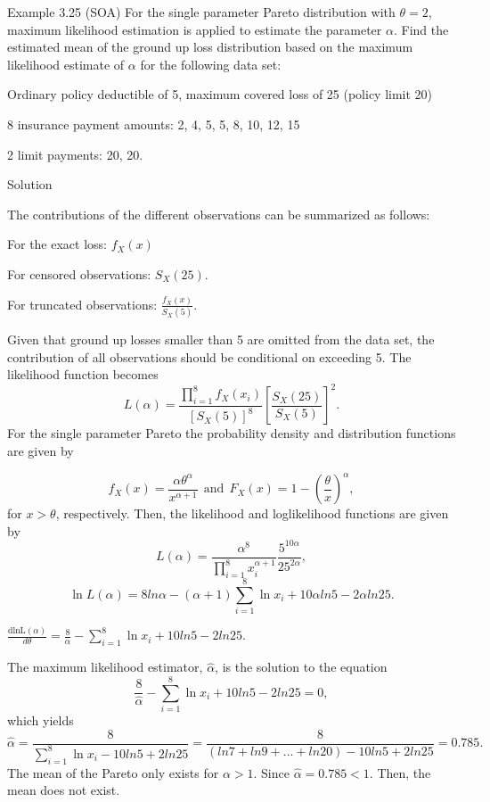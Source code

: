 \documentclass[]{book}
\theoremstyle{definition}
\theoremstyle{definition}
\theoremstyle{definition}
\theoremstyle{remark}
\begin{document}
Example 3.25 (SOA) For the single parameter Pareto distribution with
\(\theta = 2\), maximum likelihood estimation is applied to estimate the
parameter \(\alpha\). Find the estimated mean of the ground up loss
distribution based on the maximum likelihood estimate of \(\alpha\) for
the following data set:

Ordinary policy deductible of 5, maximum covered loss of 25 (policy
limit 20)

8 insurance payment amounts: 2, 4, 5, 5, 8, 10, 12, 15

2 limit payments: 20, 20.

Solution

The contributions of the different observations can be summarized as
follows:

For the exact loss: \(f_{X}\left( x \right)\)

For censored observations: \(S_{X}\left( 25 \right)\).

For truncated observations:
\(\frac{f_{X}\left( x \right)}{S_{X}\left( 5 \right)}\).

Given that ground up losses smaller than 5 are omitted from the data
set, the contribution of all observations should be conditional on
exceeding 5. The likelihood function becomes
\[L\left( \alpha \right) = \frac{\prod_{i = 1}^{8}{f_{X}\left( x_{i} \right)}}{\left\lbrack S_{X}\left( 5 \right) \right\rbrack^{8}}\left\lbrack \frac{S_{X}\left( 25 \right)}{S_{X}\left( 5 \right)} \right\rbrack^{2}.\]
For the single parameter Pareto the probability density and distribution
functions are given by

\[f_{X}\left( x \right) = \frac{\alpha\theta^{\alpha}}{x^{\alpha + 1}} \ \ \text{and} \ \ F_{X}\left( x \right) = 1 - \left( \frac{\theta}{x} \right)^{\alpha},\]
for \(x > \theta\), respectively. Then, the likelihood and loglikelihood
functions are given by
\[L\left( \alpha \right) = \frac{\alpha^{8}}{\prod_{i = 1}^{8}x_{i}^{\alpha + 1}}\frac{5^{10\alpha}}{25^{2\alpha}},\]
\[\ln L \left( \alpha \right) = 8ln\alpha - \left( \alpha + 1 \right)\sum_{i = 1}^{8}{\ln x_{i}} + 10\alpha ln5 - 2\alpha ln25.\]

\(\frac{\text{dlnL}\left( \alpha \right)}{d \theta} = \frac{8}{\alpha} - \sum_{i = 1}^{8}{\ln x_{i}} + 10ln5 - 2ln25\).

The maximum likelihood estimator, \(\hat{\alpha}\), is the solution to
the equation
\[\frac{8}{\hat{\alpha}} - \sum_{i = 1}^{8}{\ln x_{i}} + 10ln5 - 2ln25 = 0,\]which
yields
\[\hat{\alpha} = \frac{8}{\sum_{i = 1}^{8}{\ln x_{i}} - 10ln5 + 2ln25} = \frac{8}{(ln7 + ln9 + \ldots + ln20) - 10ln5 + 2ln25} = 0.785.\]
The mean of the Pareto only exists for \(\alpha > 1\). Since
\(\hat{\alpha} = 0.785 < 1\). Then, the mean does not exist.
\end{document}
